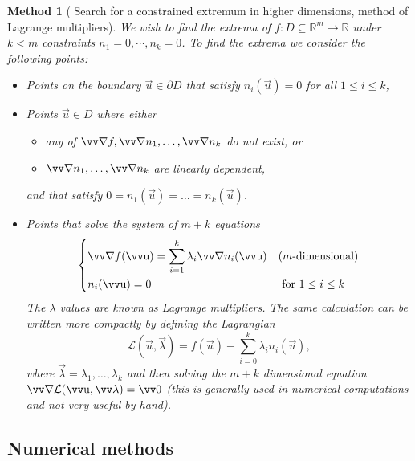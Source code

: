 \documentclass[twocolumn, margin=normal]{tex/hsrzf}
\theoremstyle{fuvarzf}
\newtheorem{method}{Method}
\begin{document}
\begin{method}[%
    Search for a constrained extremum in higher dimensions,
    method of Lagrange multipliers]
  We wish to find the extrema of \(f: D \subseteq \mathbb{R}^m \to \mathbb{R}\)
  under \(k < m\) constraints \(n_1 = 0, \cdots, n_k = 0\). To find the extrema 
  we consider the following points:
  \begin{itemize}
    \item Points on the boundary \(\vec{u} \in \partial D\) that satisfy
      \(n_i(\vec{u}) = 0\) for all \(1 \leq i \leq k\), 

    \item Points \(\vec{u} \in D\) where either
      \begin{itemize}
        \item any of \(\grad f, \grad n_1, \ldots, \grad n_k\) do not exist, or
        \item \(\grad n_1, \ldots, \grad n_k\) are linearly \emph{dependent},
      \end{itemize}
      and that satisfy \(0 = n_1(\vec{u}) = \ldots = n_k(\vec{u})\).

    \item Points that solve the system of \(m+k\) equations
      \[
        \begin{dcases}
          \grad f(\vec{u}) = \sum_{i = 1}^k \lambda_i \grad n_i(\vec{u})
            & (m\text{-dimensional}) \\
          n_i(\vec{u}) = 0  & \text{ for } 1 \leq i \leq k
        \end{dcases}
      \]
      The \(\lambda\) values are known as \emph{Lagrange multipliers}. The same
      calculation can be written more compactly by defining the
      \emph{Lagrangian}
      \[
        \mathcal{L}(\vec{u}, \vec{\lambda}) 
          = f(\vec{u}) - \sum_{i = 0}^k \lambda_i n_i(\vec{u}),
      \]
      where \(\vec{\lambda} = \lambda_1, \ldots, \lambda_k\) and then solving
      the \(m+k\) dimensional equation \(\grad \mathcal{L}(\vec{u},
      \vec{\lambda}) = \vec{0}\) (this is generally used in numerical
      computations and not very useful by hand).
  \end{itemize}
\end{method}

\subsection{Numerical methods}
\end{document}
